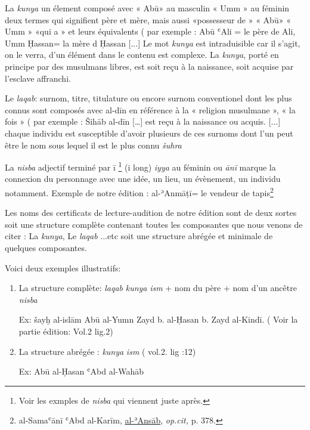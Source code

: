 \documentclass[a4paper,12pt]{report}
\begin{document}
\begin{itemize}
\begin{enumerate}
   La \textit{kunya} un élement composé avec « Abū»  au masculin « Umm » au féminin  deux termes qui signifient père et mère, mais aussi    «possesseur de »
« Abū» « Umm »   «qui a » et leurs équivalents ( par exemple :  Abū ʿAli = le père de Ali,   Umm Ḥassan= la mère d Ḥassan [...] Le mot \textit{kunya} est intraduisible car il s'agit, on le verra, d'un élément dans le contenu est complexe. La \textit{kunya}, porté en principe  par des musulmans libres, est soit reçu à la naissance, soit acquise par l'esclave affranchi.

    Le \textit{laqab}: surnom, titre, titulature ou encore surnom conventionel  dont les plus connus sont composés avec al-dīn en référence à la « religion musulmane », « la fois » ( par exemple : Šihāb al-dīn […] est reçu à la naissance ou acquis. [...] chaque individu est susceptible d'avoir plusieurs de ces  surnoms dont l'un  peut être le nom sous lequel il est le plus connu \textit{šuhra }

   La \textit{nisba} adjectif terminé par ī \footnote{Voir les exmples de \textit{nisba} qui viennent juste après. } (i long) \textit{iyya} au féminin ou \textit{ānī} marque la connexion du personnage avec une idée, un lieu, un évènement, un individu notamment. Exemple de notre édition : al-ʾAnmāṭī=  le vendeur de tapis\footnote{ al-Samaʿānī ʿAbd al-Karīm, \underline {al-ʾAnsāb}, \textit{op.cit,} p. 378.} 

Les noms des certificats de lecture-audition de notre édition sont de deux sortes soit une structure complète contenant toutes les composantes que nous venons de citer : La \textit{kunya},  Le \textit{laqab} ...etc soit une structure abrégée et minimale de quelques composantes.    

Voici deux exemples  illustratifs:

\begin{enumerate}
 

\item La structure complète:   \textit{laqab}  \textit {kunya}     \textit {ism}  + nom du père + nom d'un ancêtre     \textit{nisba }

Ex: šayḫ  al-islām Abū al-Yumn Zayd b. al-Ḥasan b. Zayd al-Kindī. ( Voir la partie édition: Vol.2 lig.2)

\item La structure abrégée :   \textit{kunya}  \textit  \textit {ism}  ( vol.2. lig :12) 

Ex:
Abū al-Ḥasan ʿAbd al-Wahāb


\end{enumerate}
\end{enumerate}
\end{itemize}
\end{document}
